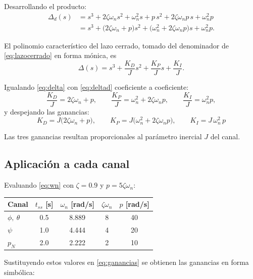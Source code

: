 \documentclass[11pt,a4paper]{article}
\begin{document}
Desarrollando el producto:
\begin{align}
\Delta_d(s)&=s^{3}+2\zeta\omega_n s^{2}+\omega_n^{2}s
            +p\,s^{2}+2\zeta\omega_n p\,s+\omega_n^{2}p \nonumber\\[2pt]
&=s^{3}+\big(2\zeta\omega_n+p\big)s^{2}
       +\big(\omega_n^{2}+2\zeta\omega_n p\big)s
       +\omega_n^{2}p .
\label{eq:deltad}
\end{align}

El polinomio característico del lazo cerrado, tomado del denominador de
\eqref{eq:lazocerrado} en forma mónica, es
\begin{equation}
\Delta(s)=s^{3}+\frac{K_D}{J}s^{2}+\frac{K_P}{J}s+\frac{K_I}{J}.
\label{eq:delta}
\end{equation}

Igualando \eqref{eq:delta} con \eqref{eq:deltad} coeficiente a coeficiente:
\begin{equation}
\frac{K_D}{J}=2\zeta\omega_n+p,\qquad
\frac{K_P}{J}=\omega_n^{2}+2\zeta\omega_n p,\qquad
\frac{K_I}{J}=\omega_n^{2}p ,
\end{equation}
y despejando las ganancias:
\begin{equation}
\boxed{\;
K_D=J\big(2\zeta\omega_n+p\big),\qquad
K_P=J\big(\omega_n^{2}+2\zeta\omega_n p\big),\qquad
K_I=J\,\omega_n^{2}\,p \;}
\label{eq:ganancias}
\end{equation}

Las tres ganancias resultan proporcionales al parámetro inercial $J$ del canal.

\subsection{Aplicación a cada canal}

Evaluando \eqref{eq:wn} con $\zeta=0.9$ y $p=5\zeta\omega_n$:

\begin{center}
\begin{tabular}{lcccc}
\toprule
Canal & $t_{ss}$ [s] & $\omega_n$ [rad/s] & $\zeta\omega_n$ & $p$ [rad/s]\\
\midrule
$\phi,\ \theta$ & 0.5 & 8.889 & 8 & 40 \\
$\psi$          & 1.0 & 4.444 & 4 & 20 \\
$p_N$           & 2.0 & 2.222 & 2 & 10 \\
\bottomrule
\end{tabular}
\end{center}

Sustituyendo estos valores en \eqref{eq:ganancias} se obtienen las ganancias en
forma simbólica:
\end{document}
